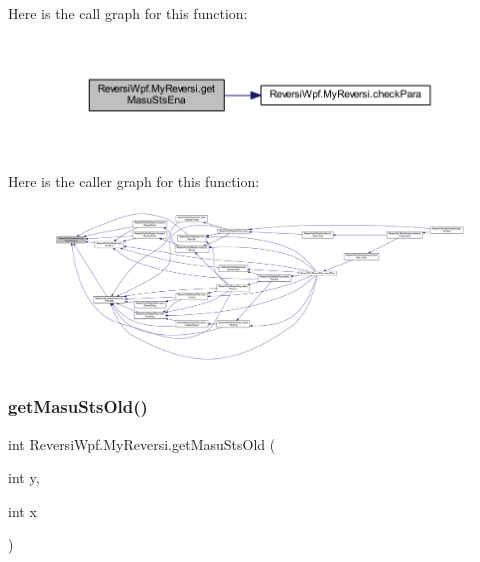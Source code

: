 Here is the call graph for this function\+:
\nopagebreak
\begin{figure}[H]
\begin{center}
\leavevmode
\includegraphics[width=350pt]{class_reversi_wpf_1_1_my_reversi_ac122d3db633616259d22d8bb885c074d_cgraph}
\end{center}
\end{figure}
Here is the caller graph for this function\+:
\nopagebreak
\begin{figure}[H]
\begin{center}
\leavevmode
\includegraphics[width=350pt]{class_reversi_wpf_1_1_my_reversi_ac122d3db633616259d22d8bb885c074d_icgraph}
\end{center}
\end{figure}
\mbox{\label{class_reversi_wpf_1_1_my_reversi_acdf94f106c88ded99a4c5dcbbc19be16}} 
\subsubsection{\texorpdfstring{get\+Masu\+Sts\+Old()}{getMasuStsOld()}}
{\footnotesize\ttfamily int Reversi\+Wpf.\+My\+Reversi.\+get\+Masu\+Sts\+Old (\begin{DoxyParamCaption}\item[{int}]{y,  }\item[{int}]{x }\end{DoxyParamCaption})}



